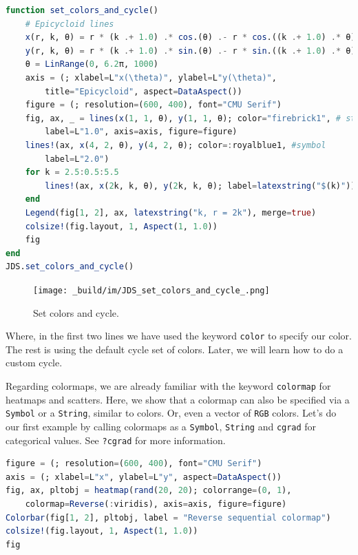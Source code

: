 \documentclass[
  notoc %
]{tufte-book}
\newcommand{\passthrough}[1]{#1}
\begin{document}
\begin{lstlisting}[language=Julia]
function set_colors_and_cycle()
    # Epicycloid lines
    x(r, k, θ) = r * (k .+ 1.0) .* cos.(θ) .- r * cos.((k .+ 1.0) .* θ)
    y(r, k, θ) = r * (k .+ 1.0) .* sin.(θ) .- r * sin.((k .+ 1.0) .* θ)
    θ = LinRange(0, 6.2π, 1000)
    axis = (; xlabel=L"x(\theta)", ylabel=L"y(\theta)",
        title="Epicycloid", aspect=DataAspect())
    figure = (; resolution=(600, 400), font="CMU Serif")
    fig, ax, _ = lines(x(1, 1, θ), y(1, 1, θ); color="firebrick1", # string
        label=L"1.0", axis=axis, figure=figure)
    lines!(ax, x(4, 2, θ), y(4, 2, θ); color=:royalblue1, #symbol
        label=L"2.0")
    for k = 2.5:0.5:5.5
        lines!(ax, x(2k, k, θ), y(2k, k, θ); label=latexstring("$(k)")) #cycle
    end
    Legend(fig[1, 2], ax, latexstring("k, r = 2k"), merge=true)
    colsize!(fig.layout, 1, Aspect(1, 1.0))
    fig
end
JDS.set_colors_and_cycle()
\end{lstlisting}

\begin{figure}
\hypertarget{fig:set_colors_and_cycle}{%
\centering
\texttt{[image: \_build/im/JDS\_set\_colors\_and\_cycle\_.png]}
\caption{Set colors and cycle.}\label{fig:set_colors_and_cycle}
}
\end{figure}

Where, in the first two lines we have used the keyword
\passthrough{\lstinline!color!} to specify our color. The rest is using
the default cycle set of colors. Later, we will learn how to do a custom
cycle.

Regarding colormaps, we are already familiar with the keyword
\passthrough{\lstinline!colormap!} for heatmaps and scatters. Here, we
show that a colormap can also be specified via a
\passthrough{\lstinline!Symbol!} or a \passthrough{\lstinline!String!},
similar to colors. Or, even a vector of \passthrough{\lstinline!RGB!}
colors. Let's do our first example by calling colormaps as a
\passthrough{\lstinline!Symbol!}, \passthrough{\lstinline!String!} and
\passthrough{\lstinline!cgrad!} for categorical values. See
\passthrough{\lstinline!?cgrad!} for more information.

\begin{lstlisting}[language=Julia]
figure = (; resolution=(600, 400), font="CMU Serif")
axis = (; xlabel=L"x", ylabel=L"y", aspect=DataAspect())
fig, ax, pltobj = heatmap(rand(20, 20); colorrange=(0, 1),
    colormap=Reverse(:viridis), axis=axis, figure=figure)
Colorbar(fig[1, 2], pltobj, label = "Reverse sequential colormap")
colsize!(fig.layout, 1, Aspect(1, 1.0))
fig
\end{lstlisting}
\end{document}
